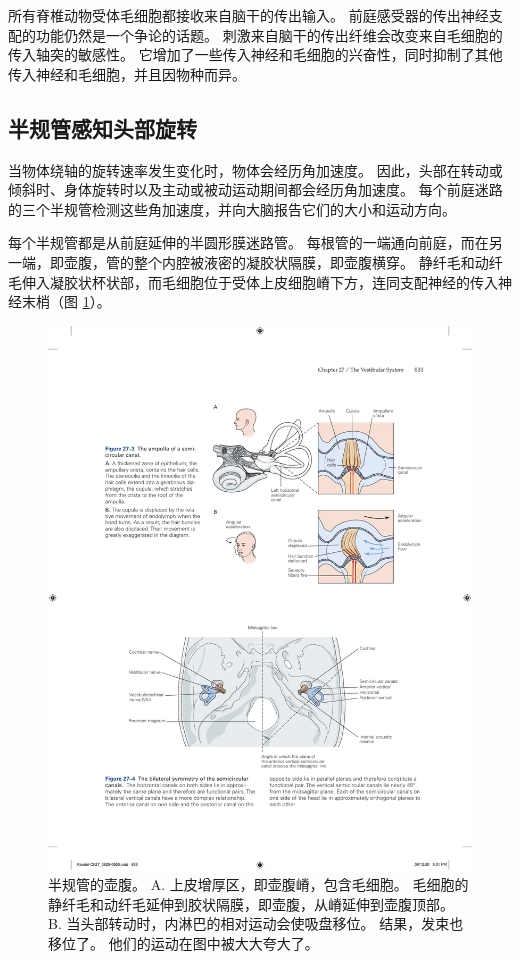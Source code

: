 所有脊椎动物受体毛细胞都接收来自脑干的传出输入。
前庭感受器的传出神经支配的功能仍然是一个争论的话题。
刺激来自脑干的传出纤维会改变来自毛细胞的传入轴突的敏感性。
它增加了一些传入神经和毛细胞的兴奋性，同时抑制了其他传入神经和毛细胞，并且因物种而异。


\subsection{半规管感知头部旋转}

当物体绕轴的旋转速率发生变化时，物体会经历角加速度。
因此，头部在转动或倾斜时、身体旋转时以及主动或被动运动期间都会经历角加速度。
每个前庭迷路的三个半规管检测这些角加速度，并向大脑报告它们的大小和运动方向。


每个半规管都是从前庭延伸的半圆形膜迷路管。
每根管的一端通向前庭，而在另一端，即壶腹，管的整个内腔被液密的凝胶状隔膜，即壶腹横穿。
静纤毛和动纤毛伸入凝胶状杯状部，而毛细胞位于受体上皮细胞嵴下方，连同支配神经的传入神经末梢（图 \ref{fig:27_3}）。

\begin{figure}[htbp]
	\centering
	\includegraphics[width=0.7\linewidth]{chap27/fig_27_3}
	\caption{半规管的壶腹。 A. 上皮增厚区，即壶腹嵴，包含毛细胞。 毛细胞的静纤毛和动纤毛延伸到胶状隔膜，即壶腹，从嵴延伸到壶腹顶部。 B. 当头部转动时，内淋巴的相对运动会使吸盘移位。 结果，发束也移位了。 他们的运动在图中被大大夸大了。}
	\label{fig:27_3}
\end{figure}


